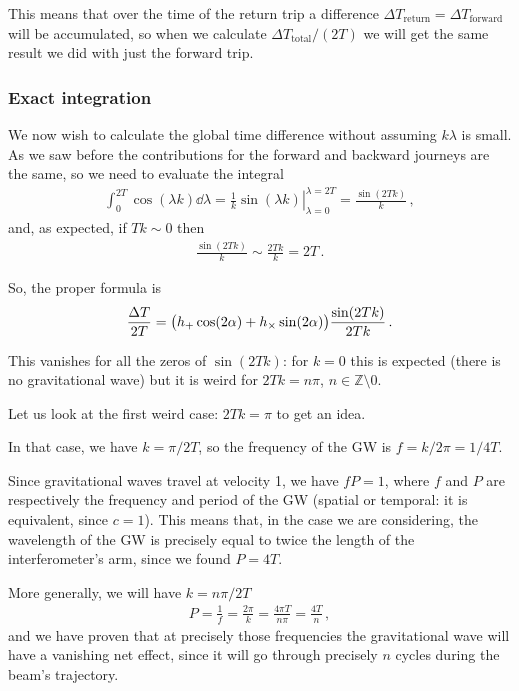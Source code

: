 \documentclass[main.tex]{subfiles}
\begin{document}
This means that over the time of the return trip a difference \(\Delta T _{\text{return}} = \Delta T _{\text{forward}}\) will be accumulated, so when we calculate \(\Delta T _{\text{total}} / (2T)\) we will get the same result we did with just the forward trip. 

\subsubsection{Exact integration}

We now wish to calculate the global time difference without assuming \(k \lambda \) is small. As we saw before the contributions for the forward and backward journeys are the same, so we need to evaluate the integral 
%
\begin{align}
\int_{0}^{2T} \cos(\lambda k) \dd{\lambda } 
= \left. \frac{1}{k} \sin(\lambda k ) \right\vert_{\lambda = 0}^{\lambda = 2T} = \frac{\sin(2Tk)}{k} 
\,,
\end{align}
%
and, as expected, if \(Tk \sim 0\) then 
%
\begin{align}
\frac{\sin(2Tk)}{k} \sim \frac{2Tk}{k} = 2T
\,.
\end{align}

So, the proper formula is 
%
\begin{align}
\frac{\Delta T}{2T} = 
\qty(h_{+} \cos(2 \alpha ) + h_{ \times } \sin(2 \alpha ))
\frac{\sin(2Tk)}{2Tk}
\,.
\end{align}

This vanishes for all the zeros of \(\sin(2Tk)\): for \(k=0\) this is expected (there is no gravitational wave) but it is weird for \(2Tk = n \pi \), \(n \in \mathbb{Z} \setminus \qty{0}\). 

Let us look at the first weird case: \(2Tk = \pi \) to get an idea. 

In that case, we have \(k =  \pi / 2T \), so the frequency of the GW is \(f = k / 2 \pi  =  1/ 4 T\). 

Since gravitational waves travel at velocity 1, we have \(fP = 1\), where \(f\) and \(P\) are respectively the  frequency and period of the GW (spatial or temporal: it is equivalent, since \(c=1\)). 
This means that, in the case we are considering, the wavelength of the GW is precisely equal to twice the length of the interferometer's arm, since we found \(P = 4T\). 

More generally, we will have \(k = n \pi /2T\)
%
\begin{align}
P = \frac{1}{f} = \frac{2 \pi }{k} = \frac{4 \pi T}{n \pi } = \frac{4T}{n}
\,,
\end{align}
%
and we have proven that at precisely those frequencies the gravitational wave will have a vanishing net effect, since it will go through precisely \(n\) cycles during the beam's trajectory. 

\end{document}

